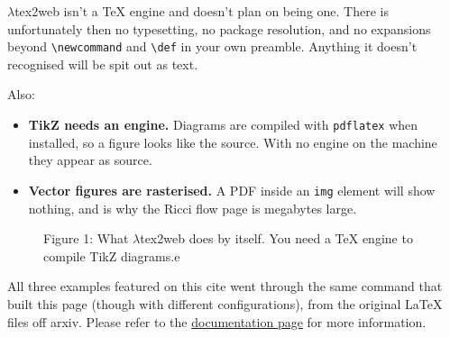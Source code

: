 \documentclass[11pt]{article}
\begin{document}
$\lambda$tex2web isn't a TeX engine and doesn't plan on being one. There is
unfortunately then no typesetting, no package resolution, and no expansions beyond
\texttt{\textbackslash newcommand} and \texttt{\textbackslash def} in your own
preamble. Anything it doesn't recognised will be spit out as text.

Also:

\begin{itemize}
  \item \textbf{TikZ needs an engine.} Diagrams are compiled with
    \texttt{pdflatex} when installed, so a figure looks like the source. With no
    engine on the machine they appear as source.
  \item \textbf{Vector figures are rasterised.} A PDF inside an \texttt{img}
    element will show nothing, and is why the Ricci flow page is megabytes large.
\end{itemize}

\begin{figure}[h]
\centering
{}
\caption{Figure 1: What $\lambda$tex2web does by itself. You need a TeX engine to
compile TikZ diagrams.e}
\end{figure}

All three examples featured on this cite went through the same command that built
this page (though with different configurations), from the original LaTeX files
off arxiv. Please refer to the
\href{site/docs.html}{documentation page} for more information.
\end{document}
